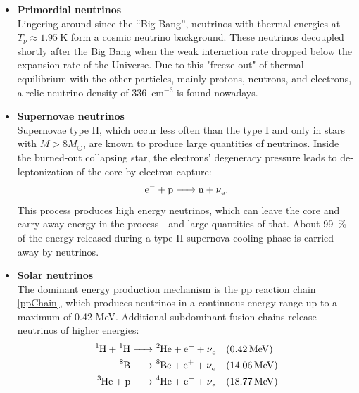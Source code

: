	\begin{itemize}
	\item {\bf Primordial neutrinos}\\
		Lingering around since the ``Big Bang'', neutrinos with thermal energies at $T_\nu\approx \SI{1.95}{\kelvin}$ form a cosmic neutrino background. These neutrinos decoupled shortly after the Big Bang when the weak interaction rate dropped below the expansion rate of the Universe. Due to this "freeze-out" of thermal equilibrium with the other particles, mainly protons, neutrons, and electrons, a relic neutrino density of 336~cm$^{-3}$ is found nowadays.
	\item {\bf Supernovae neutrinos}\\
		Supernovae type II, which occur less often than the type I and only in stars with $M> 8M_\odot$, are known to produce large quantities of neutrinos. Inside the burned-out collapsing star, the electrons' degeneracy pressure leads to de-leptonization of the core by electron capture:
		\begin{equation}
			\ce{e- + p -> n + \nu_e}.
		\end{equation}
		This process produces high energy neutrinos, which can leave the core and carry away energy in the process - and large quantities of that. About \SI{99}{\percent} of the energy released during a type II supernova cooling phase is carried away by neutrinos.

	\item {\bf Solar neutrinos}\\
		The dominant energy production mechanism is the pp reaction chain \ref{ppChain}, which produces neutrinos in a continuous energy range up to a maximum of 0.42 MeV. Additional subdominant fusion chains release neutrinos of higher energies:
		\begin{align}
		\label{ppChain}
			\ce{^1H + ^1 H} & \ce{ -> ^2 He + e+ + \nu_e} && (\SI{0.42}{\mega\electronvolt})\\
			\ce{^8B } & \ce{-> ^8Be + e+ + \nu_e} && (\SI{14.06}{\mega\electronvolt})\\
			\ce{^3He + p } & \ce{ -> ^4He + e+ + \nu_e} && (\SI{18.77}{\mega\electronvolt})
		\end{align}


\end{itemize}
